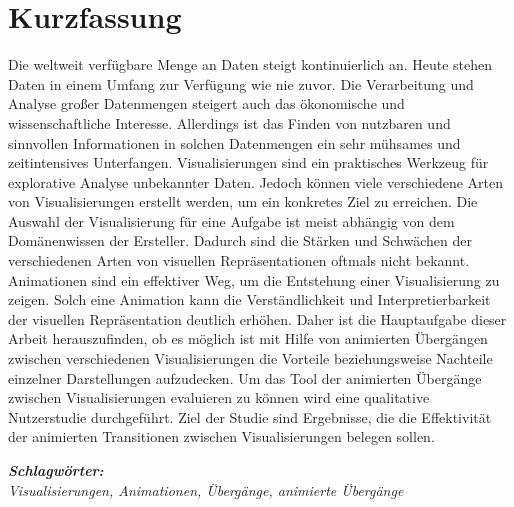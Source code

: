 
\section*{Kurzfassung}
\vspace{0.5cm}

Die weltweit verfügbare Menge an Daten steigt kontinuierlich an. Heute stehen Daten in einem Umfang zur Verfügung wie nie zuvor. Die Verarbeitung und Analyse großer Datenmengen steigert auch das ökonomische und wissenschaftliche Interesse. Allerdings ist das Finden von nutzbaren und sinnvollen Informationen in solchen Datenmengen ein sehr mühsames und zeitintensives Unterfangen. Visualisierungen sind ein praktisches Werkzeug für explorative Analyse unbekannter Daten. Jedoch können viele verschiedene Arten von Visualisierungen erstellt werden, um ein konkretes Ziel zu erreichen. Die Auswahl der Visualisierung für eine Aufgabe ist meist abhängig von dem Domänenwissen der Ersteller. Dadurch sind die Stärken und Schwächen der verschiedenen Arten von visuellen Repräsentationen oftmals nicht bekannt. Animationen sind ein effektiver Weg, um die Entstehung einer Visualisierung zu zeigen. Solch eine Animation kann die Verständlichkeit und Interpretierbarkeit der visuellen Repräsentation deutlich erhöhen. Daher ist die Hauptaufgabe dieser Arbeit herauszufinden, ob es möglich ist mit Hilfe von animierten Übergängen zwischen verschiedenen Visualisierungen die Vorteile beziehungsweise Nachteile einzelner Darstellungen aufzudecken. Um das Tool der animierten Übergänge zwischen Visualisierungen evaluieren zu können wird eine qualitative Nutzerstudie durchgeführt. Ziel der Studie sind Ergebnisse, die die Effektivität der animierten Transitionen zwischen Visualisierungen belegen sollen.

\vspace{0.5cm}
\textbf{\textit{Schlagwörter:}}\\
\textit{Visualisierungen, Animationen, Übergänge, animierte Übergänge}


